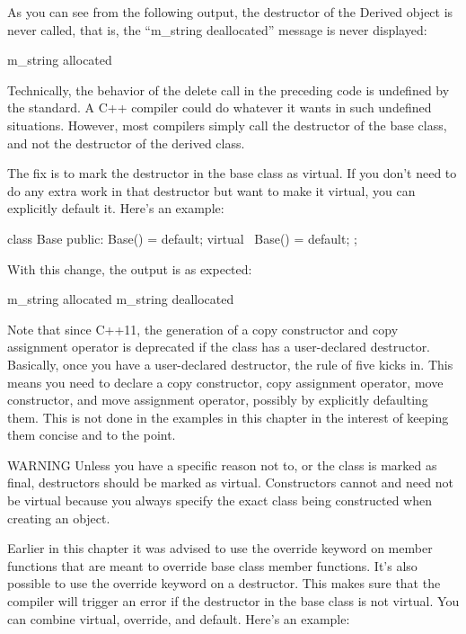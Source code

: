 As you can see from the following output, the destructor of the Derived object is never called, that is, the “m\_string deallocated” message is never displayed:

\begin{cpp}
m_string allocated
\end{cpp}

Technically, the behavior of the delete call in the preceding code is undefined by the standard. A C++ compiler could do whatever it wants in such undefined situations. However, most compilers simply call the destructor of the base class, and not the destructor of the derived class.

The fix is to mark the destructor in the base class as virtual. If you don’t need to do any extra work in that destructor but want to make it virtual, you can explicitly default it. Here’s an example:

\begin{cpp}
class Base
{
    public:
        Base() = default;
        virtual ~Base() = default;
};
\end{cpp}

With this change, the output is as expected:

\begin{shell}
m_string allocated
m_string deallocated
\end{shell}

Note that since C++11, the generation of a copy constructor and copy assignment operator is deprecated if the class has a user-declared destructor. Basically, once you have a user-declared destructor, the rule of five kicks in. This means you need to declare a copy constructor, copy assignment operator, move constructor, and move assignment operator, possibly by explicitly defaulting them. This is not done in the examples in this chapter in the interest of keeping them concise and to the point.

\begin{myWarning}{WARNING}
Unless you have a specific reason not to, or the class is marked as final, destructors should be marked as virtual. Constructors cannot and need not be virtual because you always specify the exact class being constructed when creating an object.
\end{myWarning}

Earlier in this chapter it was advised to use the override keyword on member functions that are meant to override base class member functions. It’s also possible to use the override keyword on a destructor. This makes sure that the compiler will trigger an error if the destructor in the base class is not virtual. You can combine virtual, override, and default. Here’s an example:

